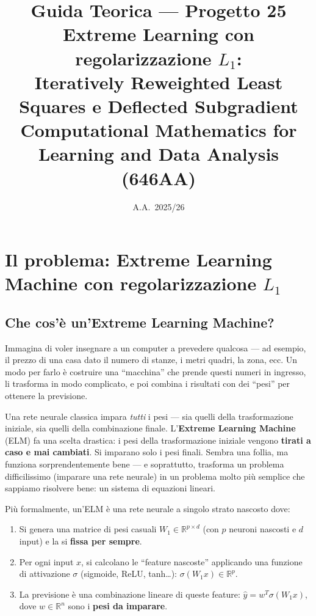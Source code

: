 \documentclass[a4paper,11pt]{article}
\title{\textbf{Guida Teorica --- Progetto 25}\\[6pt]
\large Extreme Learning con regolarizzazione $L_1$:\\
Iteratively Reweighted Least Squares e Deflected Subgradient\\[8pt]
\normalsize Computational Mathematics for Learning and Data Analysis (646AA)}
\author{}
\date{A.A.\ 2025/26}
\theoremstyle{definition}
\newcommand{\R}{\mathbb{R}}
\begin{document}
\maketitle
\tableofcontents
\newpage

\section{Il problema: Extreme Learning Machine con regolarizzazione \texorpdfstring{$L_1$}{L1}}
\label{sec:problema}

\subsection{Che cos'è un'Extreme Learning Machine?}
\label{subsec:elm}

\begin{intuizione}
Immagina di voler insegnare a un computer a prevedere qualcosa --- ad esempio, il prezzo di una casa dato il numero di stanze, i metri quadri, la zona, ecc. Un modo per farlo è costruire una ``macchina'' che prende questi numeri in ingresso, li trasforma in modo complicato, e poi combina i risultati con dei ``pesi'' per ottenere la previsione.

Una rete neurale classica impara \emph{tutti} i pesi --- sia quelli della trasformazione iniziale, sia quelli della combinazione finale. L'\textbf{Extreme Learning Machine} (ELM) fa una scelta drastica: i pesi della trasformazione iniziale vengono \textbf{tirati a caso e mai cambiati}. Si imparano solo i pesi finali. Sembra una follia, ma funziona sorprendentemente bene --- e soprattutto, trasforma un problema difficilissimo (imparare una rete neurale) in un problema molto più semplice che sappiamo risolvere bene: un sistema di equazioni lineari.
\end{intuizione}

Più formalmente, un'ELM è una rete neurale a singolo strato nascosto dove:
\begin{enumerate}
  \item Si genera una matrice di pesi casuali $W_1 \in \R^{p \times d}$ (con $p$ neuroni nascosti e $d$ input) e la si \textbf{fissa per sempre}.
  \item Per ogni input $x$, si calcolano le ``feature nascoste'' applicando una funzione di attivazione $\sigma$ (sigmoide, ReLU, tanh\ldots): $\sigma(W_1 x) \in \R^p$.
  \item La previsione è una combinazione lineare di queste feature: $\hat{y} = w^T\sigma(W_1 x)$, dove $w \in \R^n$ sono i \textbf{pesi da imparare}.
\end{enumerate}
\end{document}
